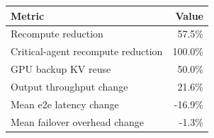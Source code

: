 \begin{tabular}{lr}
\toprule
Metric & Value \\
\midrule
Recompute reduction & 57.5\% \\
Critical-agent recompute reduction & 100.0\% \\
GPU backup KV reuse & 50.0\% \\
Output throughput change & 21.6\% \\
Mean e2e latency change & -16.9\% \\
Mean failover overhead change & -1.3\% \\
\bottomrule
\end{tabular}
